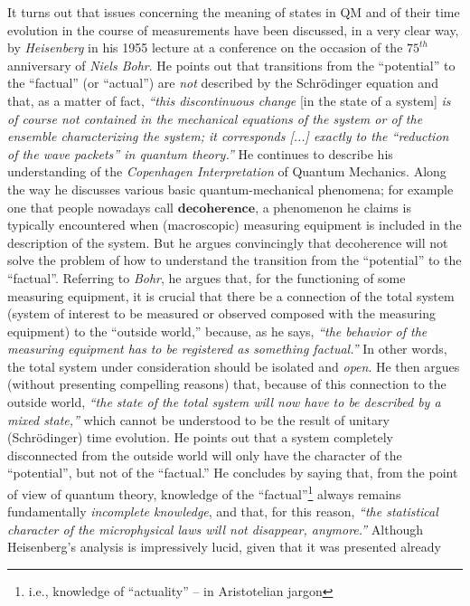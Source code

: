 \documentclass[a4paper,11pt]{article}
\begin{document}
It turns out that issues concerning the meaning of states in QM and of their time evolution in the course of
measurements have been discussed, in a very clear way, by \textit{Heisenberg} in his 1955 lecture 
\cite{Heisenberg} at a conference on the occasion of the $75^{th}$ anniversary of \textit{Niels Bohr}. He points out 
that transitions from the ``potential'' to the ``factual'' (or ``actual'') are \textit{not} described by the Schr\"odinger equation 
and that, as a matter of fact, \textit{``this discontinuous change} [in the state of a system] \textit{is of course not 
contained in the mechanical equations of the system or of the ensemble characterizing the system; it corresponds [...] 
exactly to the ``reduction of the wave packets'' in quantum theory.''} He continues to describe his 
understanding of the \textit{Copenhagen Interpretation} of Quantum Mechanics. Along the way he discusses various 
basic quantum-mechanical phenomena; for example one that people nowadays call $\mathbf{decoherence}$, a phenomenon 
he claims is typically encountered when (macroscopic) measuring equipment is included in the description of the system. 
But he argues convincingly that decoherence will not solve the problem of how to 
understand the transition from the ``potential'' to the ``factual''. 
Referring to \textit{Bohr}, he argues that, for the functioning 
of some measuring equipment, it is crucial that there be a connection of the total system (system of interest to be 
measured or observed composed with the measuring equipment) to the ``outside world,'' because, as he says, 
\textit{``the behavior of the measuring equipment has to be registered as something factual.''} In other words, the total
system under consideration should be isolated and \textit{open}.
He then argues (without presenting compelling reasons) that, because of this connection to the outside 
world, \textit{``the state of the total system will now have to be  described by a mixed state,''} which 
cannot be understood to be the result of unitary (Schr\"odinger) time evolution.
He points out that a system completely disconnected from the outside world will only 
 have the character of the ``potential'', but not of the ``factual.'' He concludes by saying that, 
from the point of view of quantum theory, knowledge of the ``factual''\footnote{i.e., knowledge of ``actuality'' -- 
in Aristotelian jargon} always remains fundamentally \textit{incomplete knowledge}, and that, for this reason, 
\textit{``the statistical character of the microphysical laws will not disappear, anymore.''}
Although Heisenberg's analysis is impressively lucid, given that it was presented already
\end{document}
